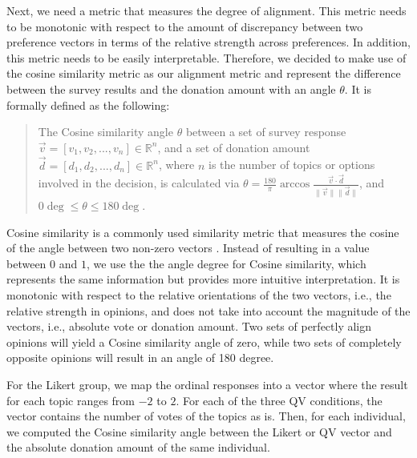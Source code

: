 Next, we need a metric that measures the degree of alignment. This metric needs to be monotonic with respect to the amount of discrepancy between two preference vectors in terms of the relative strength across preferences. In addition, this metric needs to be easily interpretable. Therefore, we decided to make use of the cosine similarity metric as our alignment metric and represent the difference between the survey results and the donation amount with an angle $\theta$. It is formally defined as the following:

\begin{quote}
    The Cosine similarity angle $\theta$ between a set of survey response $\vec{v} = [v_1, v_2, ..., v_n] \in \mathbb{R}^n$, and a set of donation amount $\vec{d} = [d_1, d_2, ..., d_n] \in \mathbb{R}^n$, where $n$ is the number of topics or options involved in the decision, is calculated via $\theta = \frac{180}{\pi} \arccos{\frac{\vec{v} \cdot \vec{d}}{\|\vec{v}\| \|\vec{d}\|}}$, and $0\deg \leq \theta \leq 180\deg$.
\end{quote}

Cosine similarity is a commonly used similarity metric 
that measures the cosine of the angle between two non-zero vectors \cite{singhal2001modern}. Instead of resulting in a value between $0$ and $1$, we use the the angle degree for Cosine similarity, which represents the same information but provides more intuitive interpretation.
It is monotonic with respect to the relative orientations of the two vectors, i.e., the relative strength in opinions, and does not take into account the magnitude of the vectors, i.e., absolute vote or donation amount. Two sets of perfectly align opinions 
will yield a Cosine similarity angle of zero, while two sets of completely opposite opinions will result in an angle of 180 degree.

For the Likert group, we map the ordinal responses into a vector where the result for each topic ranges from $-2$ to $2$. For each of the three QV conditions, the vector contains the number of votes of the topics as is. Then, for each individual, we computed the Cosine similarity angle between the Likert or QV vector and the absolute donation amount of the same individual. 

